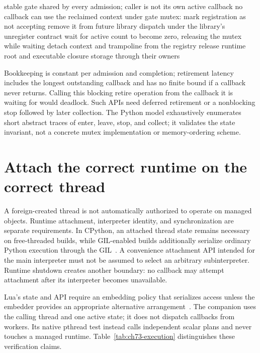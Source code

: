 \begin{algorithm}[htbp]
\caption{Retire a registration through a stable serialized admission gate.}
\label{alg:ch73-retire}
\begin{pseudocode}
\Require stable gate shared by every admission; caller is not its own active callback
\Ensure no callback can use the reclaimed context
\State under gate mutex: mark registration as not accepting
\State remove it from future library dispatch under the library's unregister contract
\State wait for active count to become zero, releasing the mutex while waiting
\State detach context and trampoline from the registry
\State release runtime root and executable closure storage through their owners
\end{pseudocode}
\end{algorithm}

Bookkeeping is constant per admission and completion; retirement latency includes the longest outstanding callback and has no finite bound if a callback never returns.
Calling this blocking retire operation from the callback it is waiting for would deadlock.
Such APIs need deferred retirement or a nonblocking stop followed by later collection.
The Python model exhaustively enumerates short abstract traces of enter, leave, stop, and collect; it validates the state invariant, not a concrete mutex implementation or memory-ordering scheme.

\section{Attach the correct runtime on the correct thread}
\label{sec:ch73-threads}
A foreign-created thread is not automatically authorized to operate on managed objects.
Runtime attachment, interpreter identity, and synchronization are separate requirements.
In CPython, an attached thread state remains necessary on free-threaded builds, while GIL-enabled builds additionally serialize ordinary Python execution through the GIL~\cite{python-2026-capi}.
A convenience attachment API intended for the main interpreter must not be assumed to select an arbitrary subinterpreter.
Runtime shutdown creates another boundary: no callback may attempt attachment after its interpreter becomes unavailable.

Lua's state and API require an embedding policy that serializes access unless the embedder provides an appropriate alternative arrangement~\cite{ierusalimschy-2026-lua}.
The companion uses the calling thread and one active state; it does not dispatch callbacks from workers.
Its native pthread test instead calls independent scalar plans and never touches a managed runtime.
Table~\ref{tab:ch73-execution} distinguishes these verification claims.

